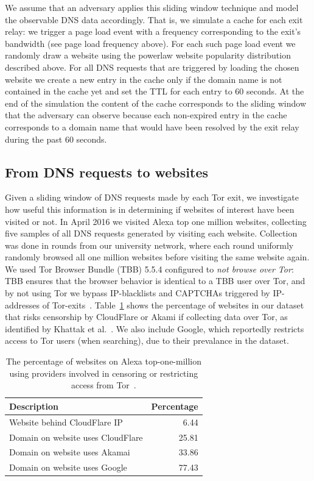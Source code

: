 We assume that an adversary applies this sliding window technique and
model the observable DNS data accordingly. That is, we simulate a cache for
each exit relay: we trigger a page load event with a frequency
corresponding to the exit's bandwidth (see page load frequency above).
For each such page load event we randomly draw a website using the
powerlaw website popularity distribution described above. For all DNS
requests that are triggered by loading the chosen website we create a
new entry in the cache only if the domain name is not contained in the
cache yet and set the TTL for each entry to 60 seconds. At the end of
the simulation the content of the cache corresponds to the sliding
window that the adversary can observe because each non-expired entry in
the cache corresponds to a domain name that would have been resolved by
the exit relay during the past 60 seconds.


\subsection{From DNS requests to websites}
Given a sliding window of DNS requests made by each Tor exit, we investigate
how useful this information is in determining if websites of interest have
been visited or not. In April 2016 we visited Alexa top one million websites,
collecting five samples of all DNS requests generated by visiting each website.
Collection was done in rounds from our university network, where
each round uniformly randomly browsed all one million websites before visiting
the same website again. We used Tor Browser Bundle (TBB) 5.5.4
configured to \emph{not browse over Tor}: TBB ensures that the browser behavior
is  identical to a TBB user over Tor, and by not using Tor we bypass
IP-blacklists and CAPTCHAs triggered by IP-addresses of
Tor-exits~\cite{Khattak2016a}.
Table~\ref{tab:dns-censor} shows the percentage of websites in our dataset that
risks censorship by CloudFlare or Akami if collecting data over Tor, as
identified by Khattak et al.~\cite{Khattak2016a}. We also include Google, which
reportedly restricts access to Tor users (when searching), due to
their prevalance in the dataset.

\begin{table}[t]
	\centering
	\caption{The percentage of websites on Alexa top-one-million using providers
	involved in censoring or restricting access from Tor~\cite{Khattak2016a}.}
	\begin{tabular}{l r}
	\toprule
	\textbf{Description} & \textbf{Percentage} \\
	\midrule
	Website behind CloudFlare IP & 6.44 \\
	Domain on website uses CloudFlare & 25.81 \\
	Domain on website uses Akamai & 33.86 \\
	Domain on website uses Google & 77.43 \\
	\bottomrule
	\end{tabular}
	\label{tab:dns-censor}
\end{table}

